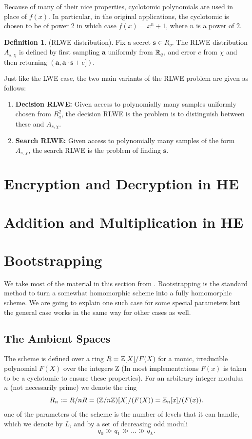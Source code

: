 \documentclass[12pt]{article}
\theoremstyle{plain}
\theoremstyle{definition}
\newtheorem{definition}{Definition}
\theoremstyle{remark}
\begin{document}
Because of many of their nice properties, cyclotomic polynomials are used in place of $f(x)$. In particular, in the original applications, the cyclotomic is chosen to be of power $2$ in which case $f(x)=x^n+1$, where $n$ is a power of $2$.

\begin{definition}(RLWE distribution). Fix a secret $\mathbf{s}\in R_q$. The RLWE distribution $A_{s,\mathcal{\chi}}$ is defined by first sampling $\mathbf{a}$ uniformly from $\mathbb{R}_q$, and error $e$ from $\mathcal{\chi}$ and then returning
$(\mathbf{a}, \mathbf{a}\cdot \mathbf{s} + e])$.
\end{definition}

Just like the LWE case, the two main variants of the RLWE problem are given as follows:
\begin{enumerate}
    \item {\bf Decision RLWE:} Given access to polynomially many samples uniformly chosen from $R_q^2$, the decision RLWE is the problem is to distinguish between these and $A_{s,\mathcal{\chi}}$.
    \item {\bf Search RLWE:} Given access to polynomially many samples of the form $A_{s,\mathcal{\chi}}$, the search RLWE is the problem of finding $\mathbf{s}$.
    \end{enumerate}

\section{Encryption and Decryption in HE}
\section{Addition and Multiplication in HE}
\section{Bootstrapping}
We take most of the material in this section from \cite{bootstrap}. Bootstrapping is the standard method to turn a somewhat homomorphic scheme into a fully homomorphic scheme. We are going to explain one such case for some special parameters but the general case works in the same way for other cases as well.
\subsection{The Ambient Spaces}
The scheme is defined over a ring $R = \mathbb{Z}[X]/F(X)$ for a monic, irreducible polynomial $F(X)$ over the integers Z (In most implementations $F(x)$ is taken to be a cyclotomic to ensure these properties). For an arbitrary integer modulus $n$ (not necessarily prime) we denote the ring
$$R_n:= R/nR = (\mathbb{Z}/n\mathbb{Z})[X]/(F(X)) = \mathbb{Z}_n[x]/(F(x)).$$ one of the parameters of the scheme is the number of levels that it can handle, which we denote by $L$, and by a set of decreasing odd moduli
$$q_0\gg q_1\gg \dots \gg q_L.$$
\end{document}
